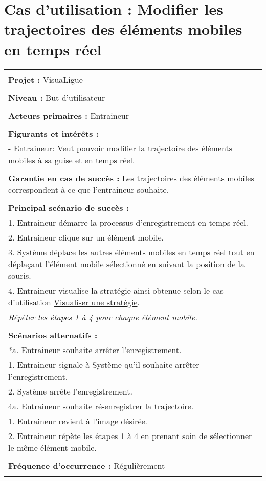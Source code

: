 \section{Cas d'utilisation : Modifier les trajectoires des éléments mobiles en temps réel}
\begin{longtable}{|p{16cm}|}
	\hline
	\\
	\textbf{Projet :} VisuaLigue\\
	\\
	\textbf{Niveau :} But d'utilisateur\\
	\\
	\textbf{Acteurs primaires :} Entraineur\\
	\\
	\textbf{Figurants et intérêts :} \\
	- Entraineur: Veut pouvoir modifier la trajectoire des éléments mobiles à sa guise et en temps réel.\\
	\\
	\textbf{Garantie en cas de succès :} Les trajectoires des éléments mobiles correspondent à ce que l'entraineur souhaite.\\
	\\
	\textbf{Principal scénario de succès :}\\
	1. Entraineur démarre la processus d'enregistrement en temps réel.\\
	2. Entraineur clique sur un élément mobile.\\
	3. Système déplace les autres éléments mobiles en temps réel tout en déplaçant l'élément mobile sélectionné en suivant la position de la souris.\\
	4. Entraineur visualise la stratégie ainsi obtenue selon le cas d'utilisation \underline{Visualiser une stratégie}.\\
	\textit{Répéter les étapes 1 à 4 pour chaque élément mobile.}\\
	\\
	\textbf{Scénarios alternatifs :}\\
	*a. Entraineur souhaite arrêter l'enregistrement.\\
	\hspace{0.5cm}1. Entraineur signale à Système qu'il souhaite arrêter l'enregistrement.\\
	\hspace{0.5cm}2. Système arrête l'enregistrement.\\
	4a. Entraineur souhaite ré-enregistrer la trajectoire.\\
	\hspace{0.5cm}1. Entraineur revient à l'image désirée.\\
	\hspace{0.5cm}2. Entraineur répète les étapes 1 à 4 en prenant soin de sélectionner le même élément mobile.\\
	\\
	\textbf{Fréquence d'occurrence :} Régulièrement\\
	\\
	\hline
\end{longtable}


